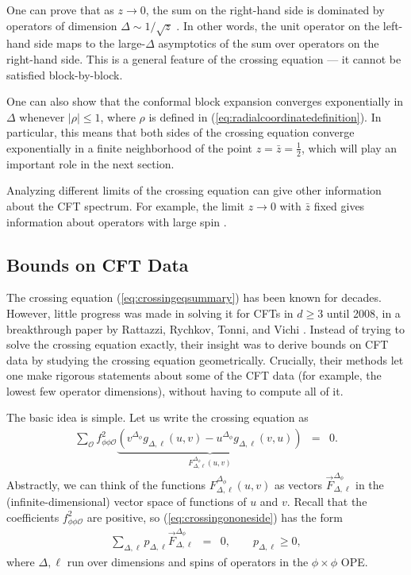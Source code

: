 \documentclass[11pt]{ws-rv9x6}
\newcommand\be{\begin{eqnarray}}
\newcommand\ee{\end{eqnarray}}
\newcommand\f\phi
\newcommand\cO{\mathcal{O}}
\newcommand\p[1]{\left(#1\right)}
\newcommand\<\langle
\renewcommand\>\rangle
\renewcommand\.{\cdot}
\newcommand\x\times
\newcommand\De{\Delta}
\begin{document}
One can prove that as $z\to 0$, the sum on the right-hand side is dominated by operators of dimension $\Delta\sim 1/\sqrt z$ \cite{Pappadopulo:2012jk}.  In other words, the unit operator on the left-hand side maps to the large-$\De$ asymptotics of the sum over operators on the right-hand side.  This is a general feature of the crossing equation --- it cannot be satisfied block-by-block.

One can also show \cite{Pappadopulo:2012jk} that the conformal block expansion converges exponentially in $\De$ whenever $|\rho|\leq 1$, where $\rho$ is defined in (\ref{eq:radialcoordinatedefinition}).  In particular, this means that both sides of the crossing equation converge exponentially in a finite neighborhood of the point $z=\bar z=\frac 1 2$, which will play an important role in the next section.

Analyzing different limits of the crossing equation can give other information about the CFT spectrum.  For example, the limit $z\to 0$ with $\bar z$ fixed gives information about operators with large spin \cite{Alday:2007mf,Fitzpatrick:2012yx,Komargodski:2012ek,Alday:2015ewa}.

\subsection{Bounds on CFT Data}
\label{sec:bounds}

The crossing equation (\ref{eq:crossingeqsummary}) has been known for decades.  However, little progress was made in solving it for CFTs in $d\geq 3$ until 2008, in a breakthrough paper by Rattazzi, Rychkov, Tonni, and Vichi \cite{Rattazzi:2008pe}.  Instead of trying to solve the crossing equation exactly, their insight was to derive bounds on CFT data by studying the crossing equation geometrically.  Crucially, their methods let one make rigorous statements about some of the CFT data (for example, the lowest few operator dimensions), without having to compute all of it.

The basic idea is simple.  Let us write the crossing equation as
\be
\label{eq:crossingononeside}
\sum_\cO f_{\f\f\cO}^2 \underbrace{\p{v^{\De_\f}g_{\De,\ell}(u,v)-u^{\De_\f} g_{\De,\ell}(v,u)}}_{F_{\De,\ell}^{\De_\f}(u,v)} &=& 0.
\ee
Abstractly, we can think of the functions $F_{\De,\ell}^{\De_\f}(u,v)$ as vectors $\vec{F}_{\De,\ell}^{\De_\f}$ in the (infinite-dimensional) vector space of functions of $u$ and $v$.  Recall that the coefficients $f_{\f\f\cO}^2$ are positive, so (\ref{eq:crossingononeside}) has the form
\be
\label{eq:abstractcrossingeq}
\sum_{\De,\ell} p_{\De,\ell} \vec{F}_{\De,\ell}^{\De_\f} &=& 0,\qquad p_{\De,\ell}\geq 0,
\ee
where $\De,\ell$ run over dimensions and spins of operators in the $\f\x\f$ OPE.  
\end{document}

